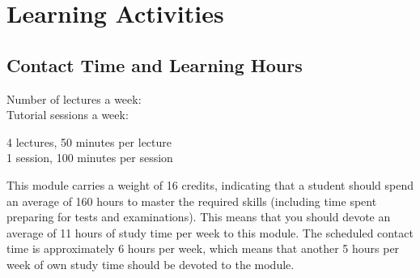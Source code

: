\section{Learning Activities}
    \subsection{Contact Time and Learning Hours}
        \begin{minipage}{0.4\linewidth}
            Number of lectures a week: \\
            Tutorial sessions a week:
        \end{minipage}
        \begin{minipage}{0.4\linewidth}
            4 lectures, 50 minutes per lecture \\
            1 session, 100 minutes per session
        \end{minipage}

        This module carries a weight of 16 credits, indicating that a
        student should spend an average of 160 hours to master the
        required skills (including time spent preparing for tests and
        examinations). This means that you should devote an average of
        11 hours of study time per week to this module. The scheduled
        contact time is approximately 6 hours per week, which
        means that another 5 hours per week of own study time
        should be devoted to the module.

